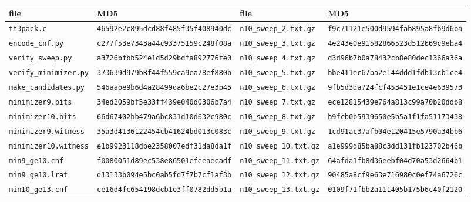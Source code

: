 \documentclass[11pt]{amsart}
\theoremstyle{plain}
\theoremstyle{definition}
\theoremstyle{remark}
\begin{document}
\begin{table}[ht]
\scriptsize
\setlength{\tabcolsep}{1pt}
\begin{center}
\begin{tabular}{ll@{\hspace{7pt}}ll}
\toprule
file & MD5 & file & MD5 \\
\midrule
\texttt{tt3pack.c} & \texttt{46592e2c895dcd88f485f35f408940dc} &
\texttt{n10\_sweep\_2.txt.gz} & \texttt{f9c71121e500d9594fab895a8fb9d6ba} \\
\texttt{encode\_cnf.py} & \texttt{c277f53e7343a44c93375159c248f08a} &
\texttt{n10\_sweep\_3.txt.gz} & \texttt{4e243e0e91582866523d512669c9eba4} \\
\texttt{verify\_sweep.py} & \texttt{a3726bfbb524e1d5d29bdfa892776fe0} &
\texttt{n10\_sweep\_4.txt.gz} & \texttt{d3d96b7b0a78432cb8e80dec1366a36a} \\
\texttt{verify\_minimizer.py} & \texttt{373639d979b8f44f559ca9ea78ef880b} &
\texttt{n10\_sweep\_5.txt.gz} & \texttt{bbe411ec67ba2e144ddd1fdb13cb1ce4} \\
\texttt{make\_candidates.py} & \texttt{546aabe9b6d4a28499da6be2c27e3b45} &
\texttt{n10\_sweep\_6.txt.gz} & \texttt{9fb5d3da724fcf453451e1ce4e639573} \\
\texttt{minimizer9.bits} & \texttt{34ed2059bf5e33ff439e040d0306b7a4} &
\texttt{n10\_sweep\_7.txt.gz} & \texttt{ece12815439e764a813c99a70b20ddb8} \\
\texttt{minimizer10.bits} & \texttt{66d67402bb479a6bc831d10d632c980c} &
\texttt{n10\_sweep\_8.txt.gz} & \texttt{b9fcb0b5939650e5b5a1f1fa51173438} \\
\texttt{minimizer9.witness} & \texttt{35a3d4136122454cb41624bd013c083c} &
\texttt{n10\_sweep\_9.txt.gz} & \texttt{1cd91ac37afb04e120415e5790a34bb6} \\
\texttt{minimizer10.witness} & \texttt{e1b9923118dbe2358007edf31da8da1f} &
\texttt{n10\_sweep\_10.txt.gz} & \texttt{a1e999d85ba88c3dd131fb123702b46b} \\
\texttt{min9\_ge10.cnf} & \texttt{f0080051d89ec538e86501efeeaecadf} &
\texttt{n10\_sweep\_11.txt.gz} & \texttt{64afda1fb8d36eebf04d70a53d2664b1} \\
\texttt{min9\_ge10.lrat} & \texttt{d13133b094e5bc0ab5fd7f7b7cf1af3b} &
\texttt{n10\_sweep\_12.txt.gz} & \texttt{90485a8cf9e63e716980c0ef74a6726c} \\
\texttt{min10\_ge13.cnf} & \texttt{ce16d4fc654198dcb1e3ff0782dd5b1a} &
\texttt{n10\_sweep\_13.txt.gz} & \texttt{0109f71fbb2a111405b175b6c40f2120} \\

\end{tabular}
\end{center}
\end{table}
\end{document}
